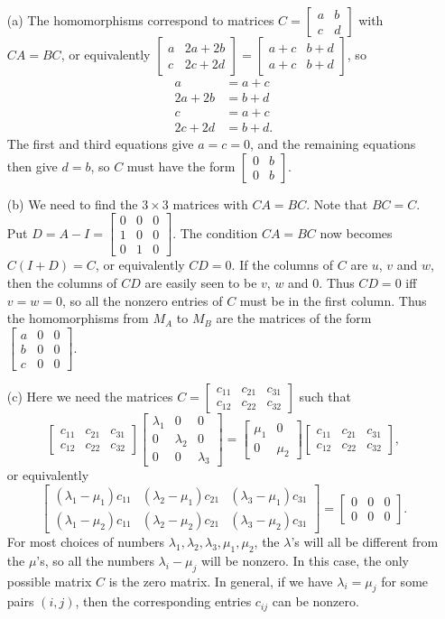 \documentclass{amsart}
\newcommand{\bbm}       {\left[\begin{matrix}}
\newcommand{\bsm}       {\left[\begin{smallmatrix}}
\newcommand{\ebm}       {\end{matrix}\right]}
\newcommand{\esm}       {\end{smallmatrix}\right]}
\newcommand{\lm}        {\lambda}
\newcommand{\tm}        {\times}
\renewcommand{\:}{\colon}
\theoremstyle{definition}
\renewenvironment{solution}{\SolutionAtEnd}{\endSolutionAtEnd}
\begin{document}
\begin{solution}
 \begin{itemize}
 \item[(a)] The homomorphisms correspond to matrices
  $C=\bsm a&b\\c&d\esm$ with $CA=BC$, or equivalently
  $\bsm a&2a+2b\\c&2c+2d\esm=\bsm a+c&b+d\\a+c&b+d\esm$, so
  \begin{align*}
   a &= a+c \\
   2a+2b &= b+d \\
   c &= a+c \\
   2c+2d &= b+d.
  \end{align*}
  The first and third equations give $a=c=0$, and the remaining
  equations then give $d=b$, so $C$ must have the form
  $\bsm 0&b\\0&b\esm$.
 \item[(b)] We need to find the $3\tm 3$ matrices with $CA=BC$.  Note
  that $BC=C$.  Put $D=A-I=\bsm 0&0&0\\1&0&0\\0&1&0\esm$.  The
  condition $CA=BC$ now becomes $C(I+D)=C$, or equivalently $CD=0$.
  If the columns of $C$ are $u$, $v$ and $w$, then the columns of $CD$
  are easily seen to be $v$, $w$ and $0$.  Thus $CD=0$ iff $v=w=0$, so
  all the nonzero entries of $C$ must be in the first column.  Thus
  the homomorphisms from $M_A$ to $M_B$ are the matrices of the form
  $\bsm a&0&0\\b&0&0\\c&0&0\esm$.
 \item[(c)] Here we need the matrices
  $C=\bbm c_{11}&c_{21}&c_{31}\\c_{12}&c_{22}&c_{32}\ebm$ such that
  \[ \bbm c_{11}&c_{21}&c_{31}\\c_{12}&c_{22}&c_{32}\ebm
     \bbm \lm_1&0&0\\0&\lm_2&0\\0&0&\lm_3\ebm =
     \bbm \mu_1&0 \\ 0&\mu_2 \ebm
     \bbm c_{11}&c_{21}&c_{31}\\c_{12}&c_{22}&c_{32}\ebm,
  \]
  or equivalently
  \[ \bbm (\lm_1-\mu_1)c_{11} &
          (\lm_2-\mu_1)c_{21} &
          (\lm_3-\mu_1)c_{31} \\
          (\lm_1-\mu_2)c_{11} &
          (\lm_2-\mu_2)c_{21} &
          (\lm_3-\mu_2)c_{31} \ebm = 
     \bbm 0&0&0 \\ 0&0&0 \ebm.
  \]
  For most choices of numbers $\lm_1,\lm_2,\lm_3,\mu_1,\mu_2$, the
  $\lm$'s will all be different from the $\mu$'s, so all the numbers
  $\lm_i-\mu_j$ will be nonzero.  In this case, the only possible
  matrix $C$ is the zero matrix.  In general, if we have $\lm_i=\mu_j$
  for some pairs $(i,j)$, then the corresponding entries $c_{ij}$ can
  be nonzero.  
 \end{itemize}
\end{solution}
\end{document}
